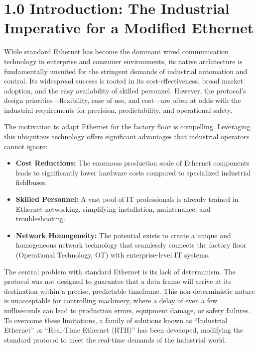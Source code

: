 \documentclass[a4paper, 12pt]{book} %
\begin{document}
\section{1.0 Introduction: The Industrial Imperative for a Modified
Ethernet}\label{introduction-the-industrial-imperative-for-a-modified-ethernet}

While standard Ethernet has become the dominant wired communication
technology in enterprise and consumer environments, its native
architecture is fundamentally unsuited for the stringent demands of
industrial automation and control. Its widespread success is rooted in
its cost-effectiveness, broad market adoption, and the easy availability
of skilled personnel. However, the protocol's design
priorities---flexibility, ease of use, and cost---are often at odds with
the industrial requirements for precision, predictability, and
operational safety.

The motivation to adapt Ethernet for the factory floor is compelling.
Leveraging this ubiquitous technology offers significant advantages that
industrial operators cannot ignore:

\begin{itemize}
\tightlist
\item
  \textbf{Cost Reductions:} The enormous production scale of Ethernet
  components leads to significantly lower hardware costs compared to
  specialized industrial fieldbuses.
\item
  \textbf{Skilled Personnel:} A vast pool of IT professionals is already
  trained in Ethernet networking, simplifying installation, maintenance,
  and troubleshooting.
\item
  \textbf{Network Homogeneity:} The potential exists to create a unique
  and homogeneous network technology that seamlessly connects the
  factory floor (Operational Technology, OT) with enterprise-level IT
  systems.
\end{itemize}

The central problem with standard Ethernet is its lack of determinism.
The protocol was not designed to guarantee that a data frame will arrive
at its destination within a precise, predictable timeframe. This
non-deterministic nature is unacceptable for controlling machinery,
where a delay of even a few milliseconds can lead to production errors,
equipment damage, or safety failures. To overcome these limitations, a
family of solutions known as ``Industrial Ethernet'' or ``Real-Time
Ethernet (RTH)'' has been developed, modifying the standard protocol to
meet the real-time demands of the industrial world.
\end{document}
